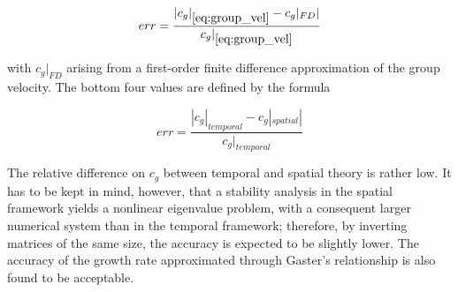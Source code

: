 $$
err = \dfrac{|c_g|_{\ref{eq:group_vel}} - c_g|_{FD}|}{c_g|_{\ref{eq:group_vel}}}
$$

with $c_g|_{FD}$ arising from a first-order finite difference approximation of the group velocity. The
bottom four values are defined by the formula

$$
err = \dfrac{|c_g|_{temporal} - c_g|_{spatial}|}{c_g|_{temporal}}
$$

The relative difference on $c_g$ between temporal and spatial theory is rather low. It has to be kept
in mind, however, that a stability analysis in the spatial framework yields a nonlinear eigenvalue
problem, with a consequent larger numerical system than in the temporal framework; therefore, by
inverting matrices of the same size, the accuracy is expected to be slightly lower. The accuracy of
the growth rate approximated through Gaster’s relationship is also found to be acceptable.

